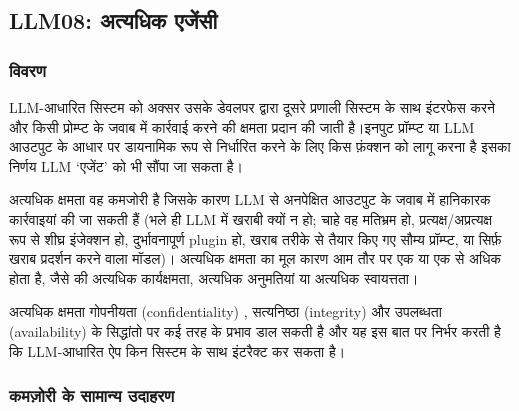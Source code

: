 \documentclass[
]{article}
\author{}
\date{}
\begin{document}
\subsection{LLM08: अत्यधिक
एजेंसी}\label{llm08-ux905ux924ux92fux927ux915-ux90fux91cux938}

\subsubsection{विवरण}\label{ux935ux935ux930ux923}

LLM-आधारित सिस्टम को अक्सर उसके डेवलपर द्वारा दूसरे प्रणाली सिस्टम के साथ इंटरफेस
करने और किसी प्रोम्प्ट के जवाब में कार्रवाई करने की क्षमता प्रदान की जाती है।इनपुट
प्रॉम्प्ट या LLM आउटपुट के आधार पर डायनामिक रूप से निर्धारित करने के लिए किस फ़ंक्शन
को लागू करना है इसका निर्णय LLM `एजेंट' को भी सौंपा जा सकता है।

अत्यधिक क्षमता वह कमजोरी है जिसके कारण LLM से अनपेक्षित आउटपुट के जवाब में हानिकारक
कार्रवाइयां की जा सकती हैं (भले ही LLM में खराबी क्यों न हो; चाहे वह मतिभ्रम हो,
प्रत्यक्ष/अप्रत्यक्ष रूप से शीघ्र इंजेक्शन हो, दुर्भावनापूर्ण plugin हो, खराब तरीके से
तैयार किए गए सौम्य प्रॉम्प्ट, या सिर्फ़ खराब प्रदर्शन करने वाला मॉडल)। अत्यधिक
क्षमता का मूल कारण आम तौर पर एक या एक से अधिक होता है, जैसे की अत्यधिक
कार्यक्षमता, अत्यधिक अनुमतियां या अत्यधिक स्वायत्तता।

अत्यधिक क्षमता गोपनीयता (confidentiality) , सत्यनिष्ठा (integrity) और
उपलब्धता (availability) के सिद्धांतो पर कई तरह के प्रभाव डाल सकती है और यह इस
बात पर निर्भर करती है कि LLM-आधारित ऐप किन सिस्टम के साथ इंटरैक्ट कर सकता है।

\subsubsection{कमज़ोरी के सामान्य
उदाहरण}\label{ux915ux92eux95bux930-ux915-ux938ux92eux928ux92f-ux909ux926ux939ux930ux923}
\end{document}

